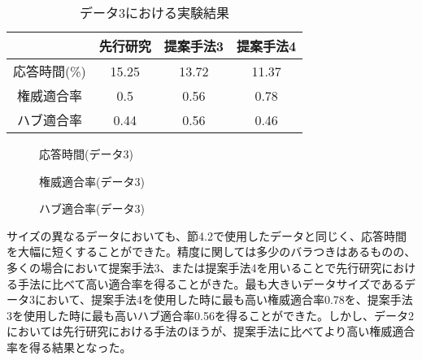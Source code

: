 \documentclass[a4paper,11pt]{jreport}
\begin{document}
\clearpage

\begin{table}[htb]
\begin{center}
\caption{データ3における実験結果}
\begin{tabular}{|c||c|c|c|} \hline 
    & 先行研究 & 提案手法3 & 提案手法4 \\ \hline \hline
    応答時間(\%) & 15.25 & 13.72 & 11.37 \\  \hline
    権威適合率 & 0.5 & 0.56 & 0.78 \\ \hline
    ハブ適合率 & 0.44 & 0.56 & 0.46 \\ \hline
\end{tabular}
\end{center}
\end{table}

\begin{figure}[htbp]
\begin{center}
\end{center}
\caption{応答時間(データ3)}
\label{figure:sample}
\end{figure}

\begin{figure}[htbp]
\begin{center}
\end{center}
\caption{権威適合率(データ3)}
\label{figure:sample}
\end{figure}

\begin{figure}[htbp]
\begin{center}
\end{center}
\caption{ハブ適合率(データ3)}
\label{figure:sample}
\end{figure}

\clearpage

サイズの異なるデータにおいても、節4.2で使用したデータと同じく、応答時間を大幅に短くすることができた。精度に関しては多少のバラつきはあるものの、多くの場合において提案手法3、または提案手法4を用いることで先行研究における手法に比べて高い適合率を得ることがきた。最も大きいデータサイズであるデータ3において、提案手法4を使用した時に最も高い権威適合率0.78を、提案手法3を使用した時に最も高いハブ適合率0.56を得ることができた。しかし、データ2においては先行研究における手法のほうが、提案手法に比べてより高い権威適合率を得る結果となった。
\end{document}
